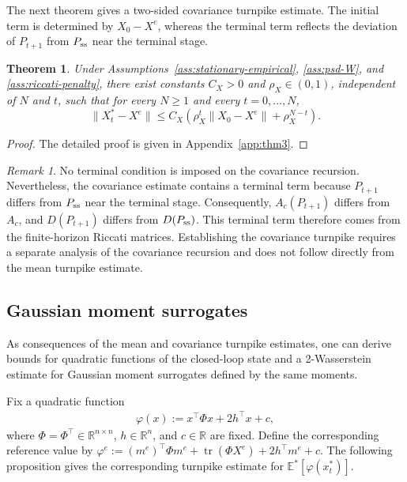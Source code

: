 \documentclass[10pt,journal,twoside]{IEEEtran}
\newtheorem{theorem}{Theorem}
\theoremstyle{definition}
\theoremstyle{remark}
\newtheorem{remark}{Remark}
\begin{document}
The next theorem gives a two-sided covariance turnpike estimate. The
initial term is determined by \(X_0-X^e\), whereas the terminal term reflects
the deviation of \(P_{t+1}\) from \(P_{\rm ss}\) near the terminal stage.
\begin{theorem}
	\label{thm:cov-turnpike}
	Under Assumptions~\ref{ass:stationary-empirical}, \ref{ass:psd-W}, and
	\ref{ass:riccati-penalty}, there exist constants \(C_X>0\)
	 and \(\rho_X\in(0,1)\), independent of \(N\) and \(t\), such
	that for every \(N\ge 1\) and every \(t=0,\ldots,N\),
	\begin{equation}
		\|X_t^*-X^e\|
		\le
		C_X
		\left(
		\rho_X^t\|X_0-X^e\|
		+
		\rho_X^{N-t}
		\right).
		\label{eq:cov-turnpike-bound}
	\end{equation}
\end{theorem}

\begin{proof}
	{The detailed proof is given in
	Appendix~\ref{app:thm3}.}
\end{proof}

\begingroup
\begin{remark}
No terminal condition is imposed on the covariance recursion. Nevertheless,
the covariance estimate contains a terminal term because \(P_{t+1}\) differs
from \(P_{\rm ss}\) near the terminal stage. Consequently,
\(A_c(P_{t+1})\) differs from \(A_c\), and \(D(P_{t+1})\) differs from
\(D(P_{\rm ss})\). This terminal term therefore comes from the
finite-horizon Riccati matrices. Establishing the covariance turnpike requires a separate analysis of the covariance recursion and does not follow
directly from the mean turnpike estimate.
\end{remark}
\endgroup






\subsection{Gaussian moment surrogates}
\label{subsec:second-order-distributional}

As consequences of the mean and covariance turnpike estimates, one can derive bounds for quadratic functions of the closed-loop state and a 2-Wasserstein estimate for Gaussian moment surrogates defined by the same moments.

Fix a quadratic function 
\begin{align}\label{eq:quadratic}
    \varphi(x):=x^\top\varPhi x+2h^\top x+c,
\end{align}
where
\(\varPhi=\varPhi^\top\in\mathbb R^{n\times n}\),
\(h\in\mathbb R^n\), and \(c\in\mathbb R\) are fixed.
Define the corresponding reference value by
$\varphi^e:=(m^e)^\top\varPhi m^e
	+\operatorname{tr}(\varPhi X^e)
	+2h^\top m^e+c$.
The following proposition gives the corresponding turnpike estimate for
\(\mathbb E^*[\varphi(x_t^*)]\).
\end{document}
